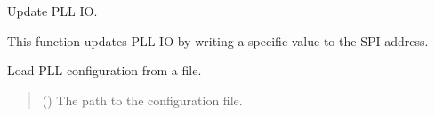 \documentclass[letterpaper,10pt,english]{sphinxmanual}
\begin{document}
\begin{fulllineitems}
\begin{fulllineitems}
\begin{quote}
\begin{description}
\end{description}\end{quote}

\end{fulllineitems}


\begin{fulllineitems}
\label{\detokenize{apidocs:management.MANAGEMENT.pll_ioupdate}}
\pysigstartsignatures
{}
\pysigstopsignatures
\sphinxAtStartPar
Update PLL IO.

\sphinxAtStartPar
This function updates PLL IO by writing a specific value to the SPI address.
\begin{quote}\begin{description}
\sphinxAtStartPar
{} \textendash{} 

\end{description}\end{quote}

\end{fulllineitems}


\begin{fulllineitems}
\label{\detokenize{apidocs:management.MANAGEMENT.pll_ldcfg}}
\pysigstartsignatures
{}
\pysigstopsignatures
\sphinxAtStartPar
Load PLL configuration from a file.
\begin{quote}\begin{description}
\sphinxAtStartPar
{} () \textendash{} The path to the configuration file.

\end{description}\end{quote}

\end{fulllineitems}



\end{fulllineitems}
\end{document}
